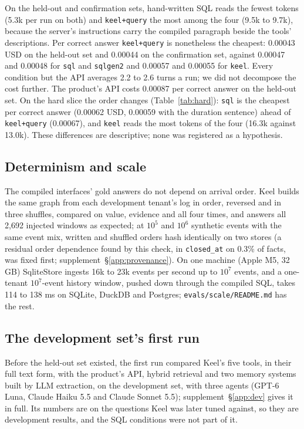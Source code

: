 \documentclass[sigconf, nonacm]{acmart}
\newcommand{\code}[1]{\texttt{#1}}
\begin{document}
On the held-out and confirmation sets, hand-written SQL reads the fewest tokens (5.3k per run on both) and \code{keel+query} the most among the four (9.5k to 9.7k), because the server's instructions carry the compiled paragraph beside the tools' descriptions. Per correct answer \code{keel+query} is nonetheless the cheapest: 0.00043 USD on the held-out set and 0.00044 on the confirmation set, against 0.00047 and 0.00048 for \code{sql} and \code{sqlgen2} and 0.00057 and 0.00055 for \code{keel}. Every condition but the API averages 2.2 to 2.6 turns a run; we did not decompose the cost further. The product's API costs 0.00087 per correct answer on the held-out set. On the hard slice the order changes (Table~\ref{tab:hard}): \code{sql} is the cheapest per correct answer (0.00062 USD, 0.00059 with the duration sentence) ahead of \code{keel+query} (0.00067), and \code{keel} reads the most tokens of the four (16.3k against 13.0k). These differences are descriptive; none was registered as a hypothesis.

\subsection{Determinism and scale}
\label{sec:determinism}

The compiled interfaces' gold answers do not depend on arrival order. Keel builds the same graph from each development tenant's log in order, reversed and in three shuffles, compared on value, evidence and all four times, and answers all 2,692 injected windows as expected; at $10^5$ and $10^6$ synthetic events with the same event mix, written and shuffled orders hash identically on two stores (a residual order dependence found by this check, in \code{closed\_at} on 0.3\% of facts, was fixed first; supplement~\S\ref{app:provenance}). On one machine (Apple M5, 32 GB) SqliteStore ingests 16k to 23k events per second up to $10^7$ events, and a one-tenant $10^7$-event history window, pushed down through the compiled SQL, takes 114 to 138 ms on SQLite, DuckDB and Postgres; \code{evals/scale/README.md} has the rest.

\subsection{The development set's first run}
\label{sec:firstrun}

Before the held-out set existed, the first run compared Keel's five tools, in their full text form, with the product's API, hybrid retrieval and two memory systems built by LLM extraction, on the development set, with three agents (GPT-6 Luna, Claude Haiku 5.5 and Claude Sonnet 5.5); supplement~\S\ref{app:dev} gives it in full. Its numbers are on the questions Keel was later tuned against, so they are development results, and the SQL conditions were not part of it.
\end{document}

